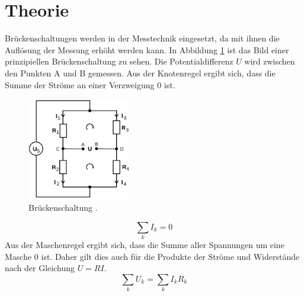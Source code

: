 \section{Theorie}
\label{sec:Theorie}
Brückenschaltungen werden in der Messtechnik eingesetzt, da mit ihnen die Auflösung
der Messung erhöht werden kann.
In Abbildung \ref{fig:Brueckenschaltung} ist das Bild einer prinzipiellen Brückenschaltung zu sehen.
Die Potentialdifferenz $U$ wird zwischen den Punkten A und B gemessen. Aus der
Knotenregel ergibt sich, dass die Summe der Ströme an einer Verzweigung $0$ ist.


\begin{figure}
  \centering
  \includegraphics[width=0.4\textwidth]{Bilder/Brueckenschaltung.png}
  \caption{Brückenschaltung \cite{sample}.}
  \label{fig:Brueckenschaltung}
\end{figure}
\begin{equation}
  \sum \limits_{k} I_k= 0
  \label{eq:knotenregel}
\end{equation}
Aus der Maschenregel ergibt sich, dass die Summe aller Spannungen um eine Masche
$0$ ist. Daher gilt dies auch für die Produkte der Ströme und Widerstände nach
der Gleichung $U=RI$.
\begin{equation}
  \sum \limits_{k} U_k=  \sum \limits_{k} I_k R_k
  \label{eq:Maschenregel}
\end{equation}


